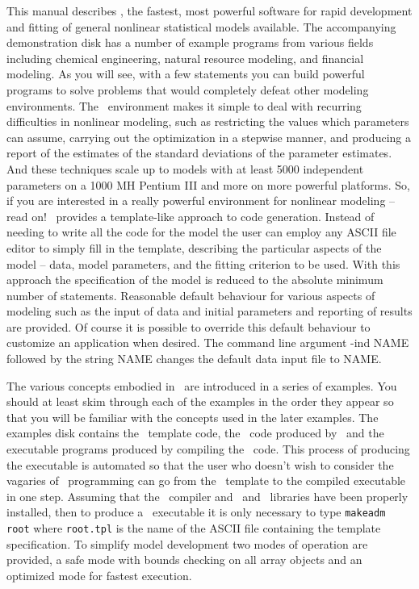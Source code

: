 \documentclass[12pt]{book}
\begin{document}
%
%
\htmlnewfile
This manual describes \ADM, the fastest, most powerful
software for rapid development and fitting of general nonlinear statistical
models available. The accompanying demonstration disk 
has a number of example  programs from various fields
including chemical engineering, natural resource modeling, and
financial modeling. As you will see, with a few
statements you can build powerful programs to solve
problems that would completely defeat other
modeling environments. The \ADM\ environment makes
it simple to deal with recurring difficulties in nonlinear
modeling, such as restricting the values which parameters can assume,
carrying out the optimization in a stepwise manner, and
producing a report of the estimates of the standard deviations
of the parameter estimates. And these techniques scale up
to models with at least 5000 independent parameters on a 1000 MH Pentium III 
and more on more powerful platforms. So, if you are interested in
a really powerful environment for nonlinear
modeling -- read on!
\ADM\ provides a template-like approach to code generation.
Instead of needing to write all the code for 
the model the user can employ any ASCII file editor to simply fill
 in the template, describing the 
particular aspects of the model -- data, model parameters, and
the  fitting criterion to be used. 
With this approach the specification of 
the model is reduced to the absolute minimum number of
statements. Reasonable default behaviour
for various aspects of modeling such as the input of data and
initial parameters and reporting of results are provided.
Of course it is possible to override
this default behaviour to customize an application when desired.
The command line argument -ind NAME followed by the string NAME changes the
default data input file to NAME. 

The various concepts embodied in \ADM\ are introduced
in a series of examples. You should at least skim through each of
the examples in the order they appear so that you will be
familiar with the concepts used in the later examples.
The examples disk 
contains the \ADM\ template code, the \cplus\ code produced
by \ADM\ and the executable programs produced by
compiling the \cplus\ code.  This process of producing the
executable is automated so that the user who doesn't wish to
consider the vagaries of \cplus\  programming can go from
the \ADM\ template to the compiled executable in one step.
Assuming that the \cplus\ compiler and \ADM\ and \AD\ libraries 
have been properly installed, then
to produce a \ADM\ executable it is only necessary to 
type {\tt makeadm  root} where {\tt root.tpl} is the name of the 
ASCII file containing the template specification. 
To simplify model development two modes of operation are
provided, a safe mode with bounds checking on all 
array objects and an optimized mode for fastest execution.
 
\end{document}
